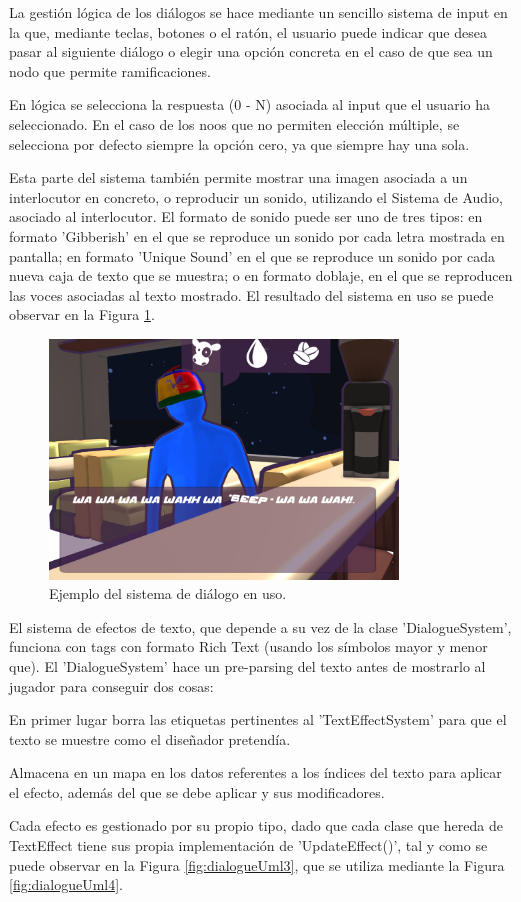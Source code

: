 La gestión lógica de los diálogos se hace mediante un sencillo sistema de input en la que, mediante teclas, botones o el ratón, el usuario
puede indicar que desea pasar al siguiente diálogo o elegir una opción concreta en el caso de que sea un nodo que permite ramificaciones.

En lógica se selecciona la respuesta (0 - N) asociada al input que el usuario ha 
seleccionado. En el caso de los noos que no permiten elección múltiple, se selecciona por defecto siempre la opción cero, ya que siempre hay una sola.

Esta parte del sistema también permite mostrar una imagen asociada a un interlocutor en concreto, o reproducir un sonido, utilizando el Sistema de Audio, asociado al
interlocutor. El formato de sonido puede ser uno de tres tipos: en formato 'Gibberish' en el que se reproduce un sonido por cada letra mostrada en pantalla; en formato
'Unique Sound' en el que se reproduce un sonido por cada nueva caja de texto que se muestra; o en formato doblaje, en el que se reproducen las voces asociadas 
al texto mostrado. El resultado del sistema en uso se puede observar en la Figura \ref{fig:dialogueExample}.

\begin{figure}[H]
  \centering
    \includegraphics[width=350px,clip=true]{dialogueExample.png}
  \caption{Ejemplo del sistema de diálogo en uso.}
  \label{fig:dialogueExample}
\end{figure}

El sistema de efectos de texto, que depende a su vez de la clase 'DialogueSystem', funciona con tags con formato Rich Text (usando los símbolos mayor y menor que). 
El 'DialogueSystem' hace un pre-parsing del texto antes de mostrarlo al jugador para conseguir dos cosas: 
\begin{compactitem}
  \item En primer lugar borra las etiquetas pertinentes al 'TextEffectSystem' para que el texto se muestre como el diseñador pretendía.
  \item Almacena en un mapa en los datos referentes a los índices del texto para aplicar el efecto, además del que se debe aplicar y sus modificadores.
\end{compactitem}
Cada efecto es gestionado por su propio tipo, dado que cada clase que hereda de TextEffect tiene sus propia implementación de 'UpdateEffect()', tal y como se puede
observar en la Figura \ref{fig:dialogueUml3}, que se utiliza mediante la Figura \ref{fig:dialogueUml4}. 

